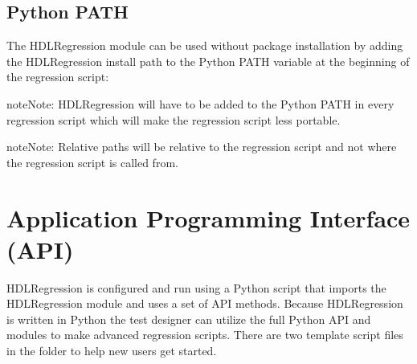 \documentclass[letterpaper,10pt,english]{sphinxmanual}
\begin{document}
\section{Python PATH}
\label{\detokenize{intro:python-path}}
\sphinxAtStartPar
The HDLRegression module can be used without package installation by adding the HDLRegression install path to the
Python PATH variable at the beginning of the regression script:

\begin{sphinxVerbatim}[commandchars=\\\{\}]

 
\end{sphinxVerbatim}

\begin{sphinxadmonition}{note}{Note:}
\sphinxAtStartPar
HDLRegression will have to be added to the Python PATH in every regression script which will make
the regression script less portable.
\end{sphinxadmonition}

\begin{sphinxadmonition}{note}{Note:}
\sphinxAtStartPar
Relative paths will be relative to the regression script
and not where the regression script is called from.
\end{sphinxadmonition}

\sphinxstepscope


\chapter{Application Programming Interface (API)}
\label{\detokenize{api:application-programming-interface-api}}\label{\detokenize{api::doc}}
\sphinxAtStartPar
HDLRegression is configured and run using a Python script that imports the HDLRegression module and
uses a set of API methods. Because HDLRegression is written in Python the test designer can
utilize the full Python API and modules to make advanced regression scripts.
There are two template script files in the  folder to help new users get started.
\end{document}
